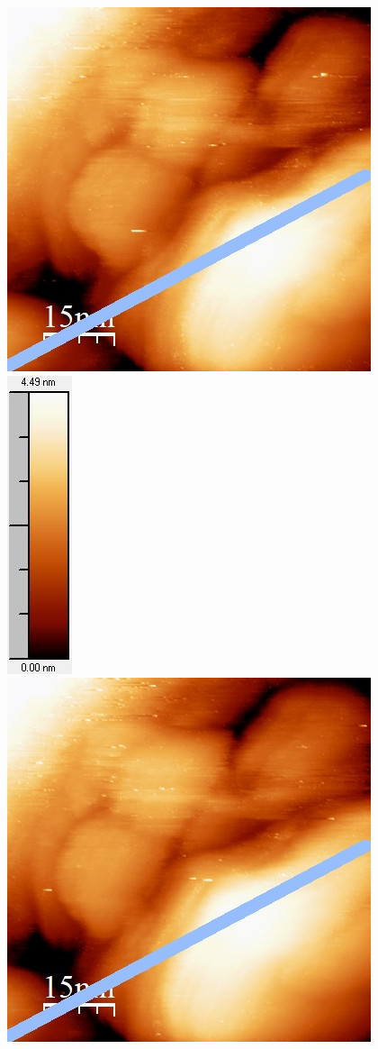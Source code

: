 \documentclass[12pt,a4paper]{article}
\begin{document}
\begin{figure}[H]
\centering
\includegraphics[scale=0.6]{Bilder/Anhang/Zeit/0_2_Zeit_vor.jpg}
\includegraphics[scale=0.6]{Bilder/Anhang/Zeit/0_2_Zeit_vor_Skala.jpg}
\includegraphics[scale=0.6]{Bilder/Anhang/Zeit/0_2_Zeit_nach.jpg}

\end{figure}
\end{document}
